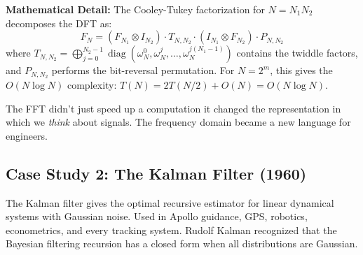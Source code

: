 \textbf{Mathematical Detail:} The Cooley-Tukey factorization for $N = N_1 N_2$ decomposes the DFT as:
\[
F_N = (F_{N_1} \otimes I_{N_2}) \cdot T_{N,N_2} \cdot (I_{N_1} \otimes F_{N_2}) \cdot P_{N,N_2}
\]
where $T_{N,N_2} = \bigoplus_{j=0}^{N_2-1} \operatorname{diag}(\omega_N^{0}, \omega_N^{j}, \dots, \omega_N^{j(N_1-1)})$ contains the twiddle factors, and $P_{N,N_2}$ performs the bit-reversal permutation. For $N = 2^m$, this gives the $O(N \log N)$ complexity: $T(N) = 2T(N/2) + O(N) = O(N \log N)$.

The FFT didn't just speed up a computation it changed the representation in which we \emph{think} about signals. The frequency domain became a new language for engineers.

\subsection{Case Study 2: The Kalman Filter (1960)}

The Kalman filter gives the optimal recursive estimator for linear dynamical systems with Gaussian noise. Used in Apollo guidance, GPS, robotics, econometrics, and every tracking system. Rudolf Kalman recognized that the Bayesian filtering recursion has a closed form when all distributions are Gaussian.

